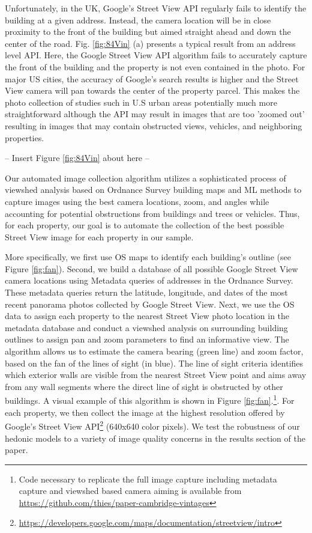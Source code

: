 \documentclass[]{article}
\begin{document}
Unfortunately, in the UK, Google's Street View API regularly fails to identify the building at a given address. Instead, the camera location will be in close proximity to the front of the building but aimed straight ahead and down the center of the road. Fig. \ref{fig:84Vin} (a) presents a typical result from an address level API. Here, the Google Street View API algorithm fails to accurately capture the front of the building and the property is not even contained in the photo. For major US cities, the accuracy of Google's search results is higher and the Street View camera will pan towards the center of the property parcel. This makes the photo collection of studies such in U.S urban areas potentially much more straightforward although the API may result in images that are too 'zoomed out' resulting in images that may contain obstructed views, vehicles, and neighboring properties.

\begin{center}
  -- Insert Figure \ref{fig:84Vin} about here --
\end{center}

Our automated image collection algorithm utilizes a sophisticated process of viewshed analysis based on Ordnance Survey building maps and ML methods to capture images using the best camera locations, zoom, and angles while accounting for potential obstructions from buildings and trees or vehicles. Thus, for each property, our goal is to automate the collection of the best possible Street View image for each property in our sample. 

More specifically, we first use OS maps to identify each building's outline (see Figure \ref{fig:fan}). Second, we build a database of all possible Google Street View camera locations using Metadata queries of addresses in the Ordnance Survey.  These metadata queries return the latitude, longitude, and dates of the most recent panorama photos collected by Google Street View. Next, we use the OS data to assign each property to the nearest Street View photo location in the metadata database and conduct a viewshed analysis on surrounding building outlines to assign pan and zoom parameters to find an informative view. The algorithm allows us to estimate the camera bearing (green line) and zoom factor, based on the fan of the lines of sight (in blue). The line of sight criteria identifies which exterior walls are visible from the nearest Street View point and aims away from any wall segments where the direct line of sight is obstructed by other buildings. A visual example of this algorithm is shown in  Figure \ref{fig:fan}.\footnote{Code necessary to replicate the full image capture including metadata capture and viewshed based camera aiming is available from \url{https://github.com/thies/paper-cambridge-vintages}}. For each property, we then collect the image at the highest resolution offered by Google's Street View API\footnote{\href{https://developers.google.com/maps/documentation/streetview/intro}{https://developers.google.com/maps/documentation/streetview/intro}} (640x640 color pixels). We test the robustness of our hedonic models to a variety of image quality concerns in the results section of the paper.
\end{document}
